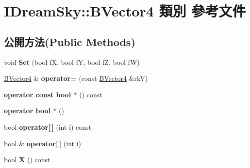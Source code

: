 \hypertarget{class_i_dream_sky_1_1_b_vector4}{}\section{I\+Dream\+Sky\+:\+:B\+Vector4 類別 參考文件}
\label{class_i_dream_sky_1_1_b_vector4}
\subsection*{公開方法(Public Methods)}
\begin{DoxyCompactItemize}
\item 
void {\bfseries Set} (bool fX, bool fY, bool fZ, bool fW)\hypertarget{class_i_dream_sky_1_1_b_vector4_a5e665ca9ffbc928a870f67d97a0ba737}{}\label{class_i_dream_sky_1_1_b_vector4_a5e665ca9ffbc928a870f67d97a0ba737}

\item 
\hyperlink{class_i_dream_sky_1_1_b_vector4}{B\+Vector4} \& {\bfseries operator=} (const \hyperlink{class_i_dream_sky_1_1_b_vector4}{B\+Vector4} \&rkV)\hypertarget{class_i_dream_sky_1_1_b_vector4_a2c7eeac07b116f1aa72bc61cc54d9efa}{}\label{class_i_dream_sky_1_1_b_vector4_a2c7eeac07b116f1aa72bc61cc54d9efa}

\item 
{\bfseries operator const bool $\ast$} () const \hypertarget{class_i_dream_sky_1_1_b_vector4_acc75dfbc38cbaa78fe7cdf176527f686}{}\label{class_i_dream_sky_1_1_b_vector4_acc75dfbc38cbaa78fe7cdf176527f686}

\item 
{\bfseries operator bool $\ast$} ()\hypertarget{class_i_dream_sky_1_1_b_vector4_a650319d17cd328ecef2c5231f2dccd60}{}\label{class_i_dream_sky_1_1_b_vector4_a650319d17cd328ecef2c5231f2dccd60}

\item 
bool {\bfseries operator\mbox{[}$\,$\mbox{]}} (int i) const \hypertarget{class_i_dream_sky_1_1_b_vector4_aba3e1d0b9c96a7d1ce3c39397fff70be}{}\label{class_i_dream_sky_1_1_b_vector4_aba3e1d0b9c96a7d1ce3c39397fff70be}

\item 
bool \& {\bfseries operator\mbox{[}$\,$\mbox{]}} (int i)\hypertarget{class_i_dream_sky_1_1_b_vector4_ac69f2bfaf85e72b583f730f9a0abfd98}{}\label{class_i_dream_sky_1_1_b_vector4_ac69f2bfaf85e72b583f730f9a0abfd98}

\item 
bool {\bfseries X} () const \hypertarget{class_i_dream_sky_1_1_b_vector4_a885c1d42ff8703c1baaa13dfa0a32550}{}\label{class_i_dream_sky_1_1_b_vector4_a885c1d42ff8703c1baaa13dfa0a32550}


\end{DoxyCompactItemize}
